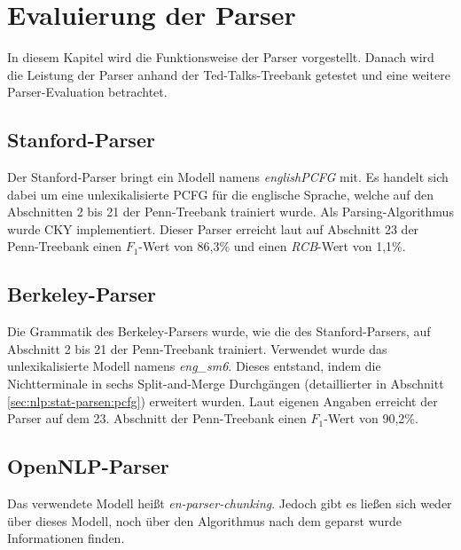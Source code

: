 %
\chapter{Evaluierung der Parser}
\label{sec:eval}

In diesem Kapitel wird die Funktionsweise der Parser vorgestellt. Danach wird die Leistung der Parser anhand der Ted-Talks-Treebank getestet und eine weitere Parser-Evaluation betrachtet.


\section{Stanford-Parser}
Der Stanford-Parser bringt ein Modell namens \textit{englishPCFG} mit. Es handelt sich dabei um eine unlexikalisierte PCFG für die englische Sprache, welche auf den Abschnitten 2 bis 21 der Penn-Treebank trainiert wurde. Als Parsing-Algorithmus wurde CKY implementiert. Dieser Parser erreicht laut \cite{stanfordparser} auf Abschnitt 23 der Penn-Treebank einen \(F_1\)-Wert von 86,3\% und einen \textit{RCB}-Wert von 1,1\%. \cite{stanfordparser}

\section{Berkeley-Parser}
Die Grammatik des Berkeley-Parsers wurde, wie die des Stanford-Parsers, auf Abschnitt 2 bis 21 der Penn-Treebank trainiert. Verwendet wurde das unlexikalisierte Modell namens \textit{eng\_sm6}. Dieses entstand, indem die Nichtterminale in sechs Split-and-Merge Durchgängen (detaillierter in Abschnitt \ref{sec:nlp:stat-parsen:pcfg}) erweitert wurden. %
Laut eigenen Angaben erreicht der Parser auf dem 23. Abschnitt der Penn-Treebank einen \(F_1\)-Wert von 90,2\%. \cite{berkeleyparser1}

\section{OpenNLP-Parser}

Das verwendete Modell heißt \textit{en-parser-chunking}. Jedoch gibt es ließen sich weder über dieses Modell, noch über den Algorithmus nach dem geparst wurde Informationen finden.


